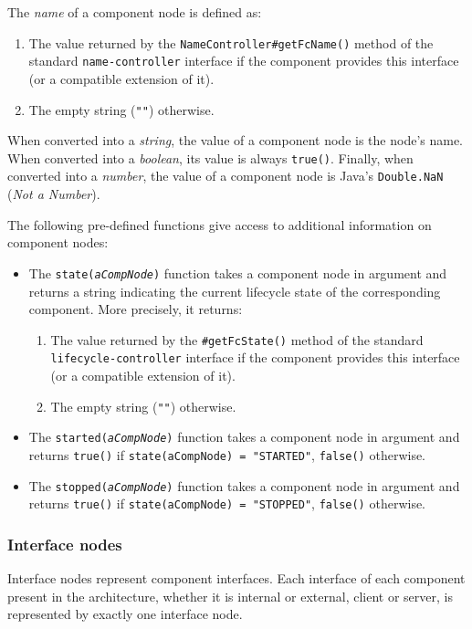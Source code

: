 \documentclass[a4paper,12pt]{report}
\begin{document}
The \emph{name} of a component node is defined as:
\begin{enumerate}
\item The value returned by the \texttt{NameController\#getFcName()} method of the
  standard \texttt{name-controller} interface if the component provides this interface (or
  a compatible extension of it).
\item The empty string (\texttt{""}) otherwise.
\end{enumerate}

When converted into a \emph{string}, the value of a component node is the node's name.
When converted into a \emph{boolean}, its value is always \texttt{true()}. Finally, when
converted into a \emph{number}, the value of a component node is Java's
\texttt{Double.NaN} (\textsl{Not a Number}).

The following pre-defined functions give access to additional information on component
nodes:
\begin{itemize}
\item The \texttt{state(\textsl{aCompNode})} function takes a component node in argument
  and returns a string indicating the current lifecycle state of the corresponding
  component. More precisely, it returns:
  \begin{enumerate}
  \item The value returned by the \texttt{\#get\-Fc\-State()} method of the standard
    \texttt{lifecycle-controller} interface if the component provides this interface (or a
    compatible extension of it).
  \item The empty string (\texttt{""}) otherwise.
  \end{enumerate}
\item The \texttt{started(\textsl{aCompNode})} function takes a component node in argument
  and returns \texttt{true()} if \texttt{state(aCompNode) = "STARTED"}, \texttt{false()}
  otherwise.
\item The \texttt{stopped(\textsl{aCompNode})} function takes a component node in argument
  and returns \texttt{true()} if \texttt{state(aCompNode) = "STOPPED"}, \texttt{false()}
  otherwise.
\end{itemize}

\subsubsection{Interface nodes}
\label{sec:interface-nodes}

Interface nodes represent component interfaces. Each interface of each component present
in the architecture, whether it is internal or external, client or server, is represented
by exactly one interface node.
\end{document}
